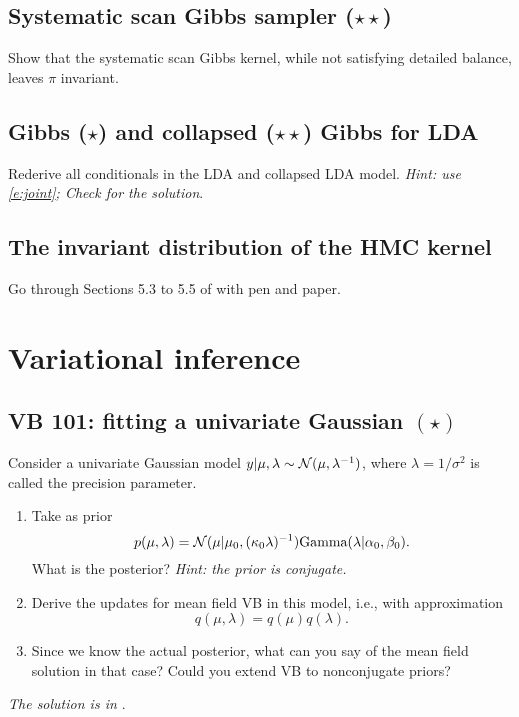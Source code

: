 \documentclass{article}
\begin{document}
\subsection{Systematic scan Gibbs sampler ($\star\star$)}
Show that the systematic scan Gibbs kernel, while not satisfying detailed balance, leaves $\pi$ invariant.

\subsection{Gibbs ($\star$) and collapsed ($\star\star$) Gibbs for LDA}
Rederive all conditionals in the LDA and collapsed LDA model.  \emph{Hint: use \eqref{e:joint}; Check \citep[Section 27.3.4]{Mur12} for the solution}.

\subsection{The invariant distribution of the HMC kernel}
Go through Sections 5.3 to 5.5 of \cite{BoSa18} with pen and paper.


\section{Variational inference}

\subsection{VB 101: fitting a univariate Gaussian $(\star)$}
Consider a univariate Gaussian model $y\vert \mu,\lambda \sim \mathcal{N}(\mu, \lambda^{-1})$, where $\lambda=1/\sigma^2$ is called the precision parameter.
\begin{enumerate}
\item Take as prior
$$
p(\mu, \lambda) = \mathcal{N}(\mu\vert \mu_0, (\kappa_0\lambda)^{-1}) \text{Gamma}(\lambda\vert \alpha_0, \beta_0).
$$
What is the posterior? \emph{Hint: the prior is conjugate.}
\item Derive the updates for mean field VB in this model, i.e., with approximation
$$ q(\mu, \lambda) = q(\mu) q(\lambda).$$
\item Since we know the actual posterior, what can you say of the mean field solution in that case? Could you extend VB to nonconjugate priors?
\end{enumerate}
\emph{The solution is in \citep[Section 21.5.1]{Mur12}}.
\end{document}
